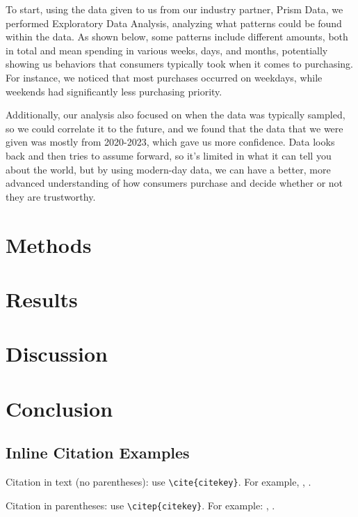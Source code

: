\documentclass[12pt,letterpaper]{article}
\begin{document}
To start, using the data given to us from our industry partner, Prism Data, we performed Exploratory Data Analysis, analyzing what patterns could be found within the data. As shown below, some patterns include different amounts, both in total and mean spending in various weeks, days, and months, potentially showing us behaviors that consumers typically took when it comes to purchasing. For instance, we noticed that most purchases occurred on weekdays, while weekends had significantly less purchasing priority.

Additionally, our analysis also focused on when the data was typically sampled, so we could correlate it to the future, and we found that the data that we were given was mostly from 2020-2023, which gave us more confidence. Data looks back and then tries to assume forward, so it's limited in what it can tell you about the world, but by using modern-day data, we can have a better, more advanced understanding of how consumers purchase and decide whether or not they are trustworthy.

\section{Methods}

\section{Results}

\section{Discussion}

\section{Conclusion}

\subsection{Inline Citation Examples}

Citation in text (no parentheses): use \texttt{{\textbackslash}cite\{citekey\}}. 
For example, \cite{breiman2011}, \cite{devlin2019bert}.

Citation in parentheses: use \texttt{{\textbackslash}citep\{citekey\}}. 
For example: \citep{vaswani2023attention}, \citep{karras2019stylebased}.


\end{document}
